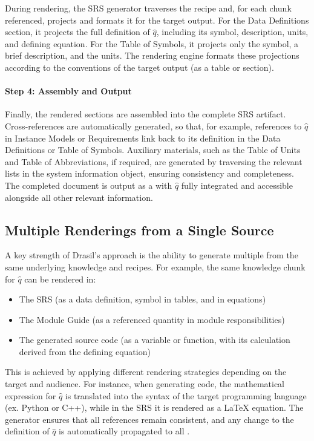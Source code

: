 During rendering, the SRS generator traverses the recipe and, for each chunk 
referenced, projects and formats it for the target output. 
For the Data Definitions section, it projects the full definition of $\hat{q}$, 
including its symbol, description, units, and defining equation. For the Table 
of Symbols, it projects only the symbol, a brief description, and the units. 
The rendering engine formats these projections according to the conventions of 
the target output (as a  table or 
section). 

\paragraph{Step 4: Assembly and Output}

Finally, the rendered sections are assembled into the complete SRS artifact. 
Cross-references are automatically generated, so that, for example, references 
to $\hat{q}$ in Instance Models or Requirements link back to its definition in 
the Data Definitions or Table of Symbols. Auxiliary materials, such as the 
Table of Units and Table of Abbreviations, if required, are generated by 
traversing the relevant lists in the system information object, ensuring 
consistency and completeness. The completed document is output as a 
 with $\hat{q}$ fully integrated and accessible 
alongside all other relevant information.

\subsection{Multiple Renderings from a Single Source}

A key strength of Drasil's approach is the ability to generate multiple \sfs{} 
from the same underlying knowledge and recipes. For example, the same knowledge 
chunk for $\hat{q}$ can be rendered in:
\begin{itemize}
    \item The SRS (as a data definition, symbol in tables, and in equations)
    \item The Module Guide (as a referenced quantity in module responsibilities)
    \item The generated source code (as a variable or function, with its calculation derived from the defining equation)
\end{itemize}

This is achieved by applying different rendering strategies depending on the 
target \sf{} and audience. For instance, when generating code, the 
mathematical expression for $\hat{q}$ is translated into the syntax of the 
target programming language (ex. Python or C++), while in the SRS it is 
rendered as a \LaTeX{} equation. The generator ensures that all references 
remain consistent, and any change to the definition of $\hat{q}$ is 
automatically propagated to all \sfs{}.

